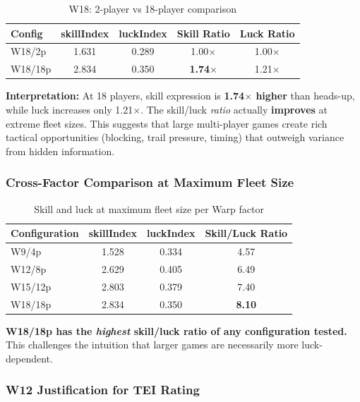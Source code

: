 \documentclass[11pt,letterpaper]{article}
\begin{document}
\begin{table}[h]
\centering
\begin{tabular}{@{}lcccc@{}}
\toprule
\textbf{Config} & \textbf{skillIndex} & \textbf{luckIndex} & \textbf{Skill Ratio} & \textbf{Luck Ratio} \\
\midrule
W18/2p & 1.631 & 0.289 & 1.00$\times$ & 1.00$\times$ \\
W18/18p & 2.834 & 0.350 & \textbf{1.74$\times$} & 1.21$\times$ \\
\bottomrule
\end{tabular}
\caption{W18: 2-player vs 18-player comparison}
\end{table}

\textbf{Interpretation:} At 18 players, skill expression is \textbf{1.74$\times$ higher} than heads-up, while luck increases only 1.21$\times$. The skill/luck \textit{ratio} actually \textbf{improves} at extreme fleet sizes. This suggests that large multi-player games create rich tactical opportunities (blocking, trail pressure, timing) that outweigh variance from hidden information.

\subsubsection{Cross-Factor Comparison at Maximum Fleet Size}

\begin{table}[h]
\centering
\begin{tabular}{@{}lccc@{}}
\toprule
\textbf{Configuration} & \textbf{skillIndex} & \textbf{luckIndex} & \textbf{Skill/Luck Ratio} \\
\midrule
W9/4p & 1.528 & 0.334 & 4.57 \\
W12/8p & 2.629 & 0.405 & 6.49 \\
W15/12p & 2.803 & 0.379 & 7.40 \\
W18/18p & 2.834 & 0.350 & \textbf{8.10} \\
\bottomrule
\end{tabular}
\caption{Skill and luck at maximum fleet size per Warp factor}
\end{table}

\textbf{W18/18p has the \textit{highest} skill/luck ratio of any configuration tested.} This challenges the intuition that larger games are necessarily more luck-dependent.

\subsubsection{W12 Justification for TEI Rating}
\end{document}
